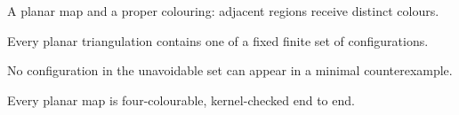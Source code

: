 
\begin{definition}\label{def:planar-colouring}
  \leanok
  A planar map and a proper colouring: adjacent regions receive distinct colours.
\end{definition}

\begin{theorem}\label{thm:unavoidable}
  \leanok
  Every planar triangulation contains one of a fixed finite set of configurations.
\end{theorem}

\begin{theorem}[Reducibility]\label{thm:reducible}
  \leanok
  No configuration in the unavoidable set can appear in a minimal counterexample.
\end{theorem}

\begin{theorem}\label{thm:four-color}
  \leanok
  Every planar map is four-colourable, kernel-checked end to end.
\end{theorem}
